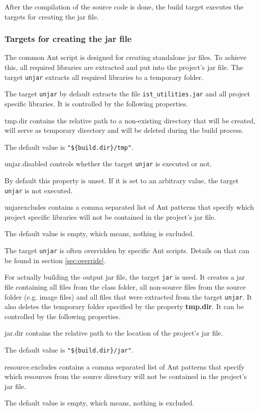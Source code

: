 \documentclass[a4paper,twoside,11pt,bibtotoc]{article}
\begin{document}
After the compilation of the source code is done, the build target executes the targets for creating the jar file.

\subsubsection{Targets for creating the jar file}
The common Ant script is designed for creating standalone jar files.
To achieve this, all required libraries are extracted and put into the project's jar file.
The target \texttt{unjar} extracts all required libraries to a temporary folder.

The target \texttt{unjar} by default extracts the file \texttt{ist\_utilities.jar} and all project specific libraries.
It is controlled by the following properties.
\begin{description*}
	\item[tmp.dir] contains the relative path to a non-existing directory that will be created, will serve as temporary directory and will be deleted during the build process.\par The default value is \texttt{"\$\{build.dir\}/tmp"}.
	\item[unjar.disabled] controls whether the target \texttt{unjar} is executed or not.\par By default this property is unset. If it is set to an arbitrary value, the target \texttt{unjar} is not executed.
	\item[unjarexcludes] contains a comma separated list of Ant patterns that specify which project specific libraries will not be contained in the project's jar file.\par The default value is empty, which means, nothing is excluded.
\end{description*}

The target \texttt{unjar} is often overridden by specific Ant scripts.
Details on that can be found in section \ref{sec:override}.

For actually building the output jar file, the target \texttt{jar} is used.
It creates a jar file containing all files from the class folder, all non-source files from the source folder (e.g. image files) and all files that were extracted from the target \texttt{unjar}.
It also deletes the temporary folder specified by the property \textbf{tmp.dir}.
It can be controlled by the following properties.

\begin{description*}
	\item[jar.dir] contains the relative path to the location of the project's jar file.\par The default value is \texttt{"\$\{build.dir\}/jar"}.
	\item[resource.excludes] contains a comma separated list of Ant patterns that specify which resources from the source directory will not be contained in the project's jar file.\par The default value is empty, which means, nothing is excluded.
\end{description*}
\end{document}
